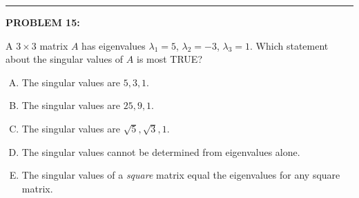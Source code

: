 \documentclass[12pt]{amsart}
\newcommand{\divider}{
  \vspace{-1em} %
  \noindent
  \raisebox{-0.15ex}{\textbullet}%
  \hspace{0.5em}%
  \rule[0.5ex]{0.95\textwidth}{1.0pt}%
  \hspace{0.5em}%
  \raisebox{-0.15ex}{\textbullet}%
  \vspace{0em} %
}
\begin{document}

\divider

{\bf PROBLEM 15:}

A $3 \times 3$ matrix $A$ has eigenvalues $\lambda_1 = 5$, $\lambda_2 = -3$, $\lambda_3 = 1$.
%
Which statement about the singular values of $A$ is most TRUE?

\begin{enumerate}[(A)]
\item The singular values are $5, 3, 1$.
\item The singular values are $25, 9, 1$.
\item The singular values are $\sqrt{5}, \sqrt{3}, 1$.
\item The singular values cannot be determined from eigenvalues alone.
\item The singular values of a {\em square} matrix equal the eigenvalues for any square matrix.
\end{enumerate}
\end{document}
